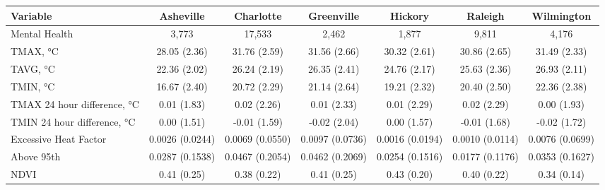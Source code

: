 \begin{longtable}{lcccccc}
\toprule
\textbf{Variable} & \textbf{Asheville} & \textbf{Charlotte} & \textbf{Greenville} & \textbf{Hickory} & \textbf{Raleigh} & \textbf{Wilmington} \\ 
\midrule
Mental Health & 3,773 & 17,533 & 2,462 & 1,877 & 9,811 & 4,176 \\ 
TMAX, °C & 28.05 (2.36) & 31.76 (2.59) & 31.56 (2.66) & 30.32 (2.61) & 30.86 (2.65) & 31.49 (2.33) \\ 
TAVG, °C & 22.36 (2.02) & 26.24 (2.19) & 26.35 (2.41) & 24.76 (2.17) & 25.63 (2.36) & 26.93 (2.11) \\ 
TMIN, °C & 16.67 (2.40) & 20.72 (2.29) & 21.14 (2.64) & 19.21 (2.32) & 20.40 (2.50) & 22.36 (2.38) \\ 
TMAX 24 hour difference, °C & 0.01 (1.83) & 0.02 (2.26) & 0.01 (2.33) & 0.01 (2.29) & 0.02 (2.29) & 0.00 (1.93) \\ 
TMIN 24 hour difference, °C & 0.00 (1.51) & -0.01 (1.59) & -0.02 (2.04) & 0.00 (1.57) & -0.01 (1.68) & -0.02 (1.72) \\ 
Excessive Heat Factor & 0.0026 (0.0244) & 0.0069 (0.0550) & 0.0097 (0.0736) & 0.0016 (0.0194) & 0.0010 (0.0114) & 0.0076 (0.0699) \\ 
Above 95th & 0.0287 (0.1538) & 0.0467 (0.2054) & 0.0462 (0.2069) & 0.0254 (0.1516) & 0.0177 (0.1176) & 0.0353 (0.1627) \\ 
NDVI & 0.41 (0.25) & 0.38 (0.22) & 0.41 (0.25) & 0.43 (0.20) & 0.40 (0.22) & 0.34 (0.14) \\ 
\bottomrule
\end{longtable}

